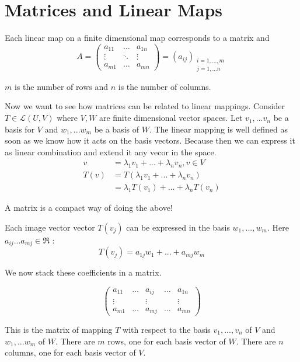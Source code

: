 \chapter{Matrices and Linear Maps}

Each linear map on a finite dimensional map corresponds to a matrix and 
\[ A = 
\begin{pmatrix}
	a_{11} & \dots &  a_{1n} \\
	\vdots & \ddots & \vdots \\
	a_{m1} & \dots & a_{mn}
\end{pmatrix}
 = (a_{ij})_{\substack{i=1,...,m \\ j=1,...n}}
\]

$m$ is the number of rows and $n$ is the number of columns. 

Now we want to see how matrices can be related to linear mappings. Consider $T \in \mathcal{L}(U,V)$ where $V,W$ are finite dimensional vector spaces. Let $v_1,...v_n$ be a basis for $V$ and $w_1,...w_m$ be a basis of $W$. The linear mapping is well defined as soon as we know how it acts on the basis vectors. Because then we can express it as linear combination and extend it any vecor in the space. 
\begin{align*}
v &= \lambda_1 v_1 + ... + \lambda_n v_n , v \in V \\ 
T(v) &= T(\lambda_1 v_1 + ... + \lambda_n v_n) \\ 
&= \lambda_1 T(v_1) + ... + \lambda_n T(v_n) 
\end{align*}

A matrix is a compact way of doing the above! 

Each image vector vector $T(v_j)$ can be expressed in the basis $w_1,...,w_m$. Here $a_{ij}...a_{mj} \in \Re$ : 
\begin{equation*}
	T(v_j) = a_{1j} w_1 + ... + a_{mj} w_m
\end{equation*}

We now stack these coefficients in a matrix.

\[  
\begin{pmatrix}
a_{11} & \dots & a_{ij} & \dots & a_{1n} \\
\vdots  & &  \vdots & & \vdots \\
a_{m1} & \dots & a_{mj} & \dots & a_{mn}
\end{pmatrix}
\]

This is the matrix of mapping $T$ with respect to the basis $v_1,...,v_n$ of $V$ and $w_1,...w_m$ of $W$. 
There are $m$ rows, one for each basis vector of $W$. There are $n$ columns, one for each basis vector of $V$.  \\

